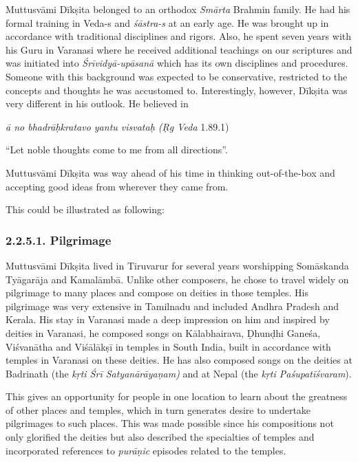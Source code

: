 Muttusvāmi Dīkṣita belonged to an orthodox \textit{Smārta} Brahmin family. He had his formal training in Veda-s and \textit{śāstra-s} at an early age. He was brought up in accordance with traditional disciplines and rigors. Also, he spent seven years with his Guru in Varanasi where he received additional teachings on our scriptures and was initiated into \textit{Śrīvidyā-upāsanā} which has its own disciplines and procedures. Someone with this background was expected to be conservative, restricted to the concepts and thoughts he was accustomed to. Interestingly, however, Dīkṣita was very different in his outlook. He believed in

\begin{myquote}
\textit{ā no bhadrāḥkratavo yantu visvataḥ (Ṛg Veda} 1.89.1)
\end{myquote}

“Let noble thoughts come to me from all directions”.

Muttusvāmi Dīkṣita was way ahead of his time in thinking out-of-the-box and accepting good ideas from wherever they came from.

This could be illustrated as following:

\vspace{-.2cm}

\subsubsection*{2.2.5.1. Pilgrimage}

Muttusvāmi Dīkṣita lived in Tiruvarur for several years worshipping Somāskanda Tyāgarāja and Kamalāmbā. Unlike other composers, he chose to travel widely on pilgrimage to many places and compose on deities in those temples. His pilgrimage was very extensive in Tamilnadu and included Andhra Pradesh and Kerala. His stay in Varanasi made a deep impression on him and inspired by deities in Varanasi, he composed songs on Kālabhairava, Ḍhunḍhi Ganeśa, Viśvanātha and Viśālākṣī in temples in South India, built in accordance with temples in Varanasi on these deities. He has also composed songs on the deities at Badrinath (the \textit{kṛti Śrī Satyanārāyaṇam)} and at Nepal (the\textit{ kṛti Paśupatīśvaram}).

This gives an opportunity for people in one location to learn about the greatness of other places and temples, which in turn generates desire to undertake pilgrimages to such places. This was made possible since his compositions not only glorified the deities but also described the specialties of temples and incorporated references to \textit{purāṇic} episodes related to the temples.

